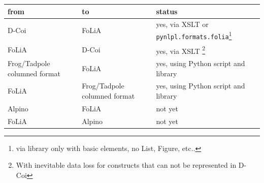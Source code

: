 \documentclass[a4paper,12pt]{report}
\begin{document}
\begin{tabular}{|l|l|l|}
\hline
from & to & status  \\
\hline
D-Coi & FoLiA & yes, via XSLT or \texttt{pynlpl.formats.folia}\footnote{via library only with basic elements, no List, Figure, etc..} \\
FoLiA & D-Coi & yes, via XSLT \footnote{With inevitable data loss for constructs that can not be represented in D-Coi} \\
Frog/Tadpole columned format & FoLiA & yes, using Python script and library \\
FoLiA & Frog/Tadpole columned format & yes, using Python script and library \\
Alpino & FoLiA & not yet \\
FoLiA & Alpino & not yet \\
\hline
\end{tabular} 



\end{document}
